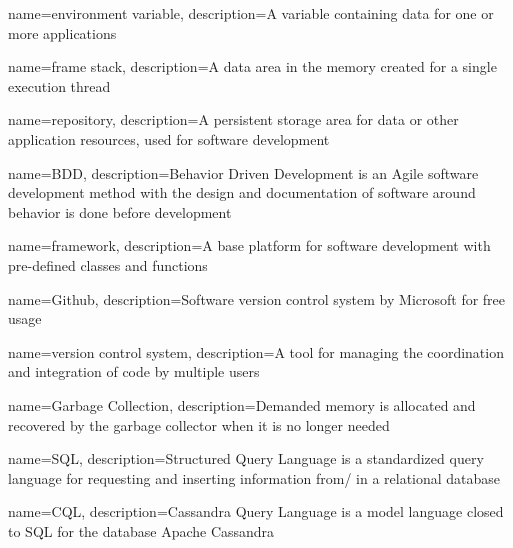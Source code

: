 {
    name={environment variable},
    description={A variable containing data for one or more applications}
}

{
    name={frame stack},
    description={A data area in the memory created for a single execution thread}
}

{
    name={repository},
    description={A persistent storage area for data or other application resources, used for software development}
}


{
    name={BDD},
    description={Behavior Driven Development is an Agile software development method with the design and documentation of software around behavior is done before development}
}

{
    name={framework},
    description={A base platform for software development with pre-defined classes and functions}
}


{
    name={Github},
    description={Software version control system by Microsoft for free usage}
}

{
    name={version control system},
    description={A tool for managing the coordination and integration of code by multiple users}
}

{
    name={Garbage Collection},
    description={Demanded memory is allocated and recovered by the garbage collector when it is no longer needed}
}

{
    name={SQL},
    description={Structured Query Language is a standardized query language for requesting and inserting information from/ in a relational database}
}

{
    name={CQL},
    description={Cassandra Query Language is a model language closed to SQL for the database Apache Cassandra}
}

\glsaddall
